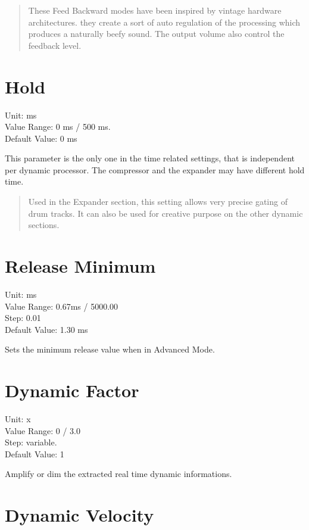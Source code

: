 \documentclass[
  letterpaper,
  DIV=11,
  numbers=noendperiod]{scrreport}
\begin{document}
\begin{quote}
These Feed Backward modes have been inspired by vintage hardware
architectures. they create a sort of auto regulation of the processing
which produces a naturally beefy sound. The output volume also control
the feedback level.
\end{quote}

\hypertarget{hold}{%
\section{Hold}\label{hold}}

Unit: ms\\
Value Range: 0 ms / 500 ms.\\
Default Value: 0 ms

This parameter is the only one in the time related settings, that is
independent per dynamic processor. The compressor and the expander may
have different hold time.

\begin{quote}
Used in the Expander section, this setting allows very precise gating of
drum tracks. It can also be used for creative purpose on the other
dynamic sections.
\end{quote}

\hypertarget{release-minimum}{%
\section{Release Minimum}\label{release-minimum}}

Unit: ms\\
Value Range: 0.67ms / 5000.00\\
Step: 0.01\\
Default Value: 1.30 ms

Sets the minimum release value when in Advanced Mode.

\hypertarget{dynamic-factor}{%
\section{Dynamic Factor}\label{dynamic-factor}}

Unit: x\\
Value Range: 0 / 3.0\\
Step: variable.\\
Default Value: 1

Amplify or dim the extracted real time dynamic informations.

\hypertarget{dynamic-velocity}{%
\section{Dynamic Velocity}\label{dynamic-velocity}}
\end{document}
